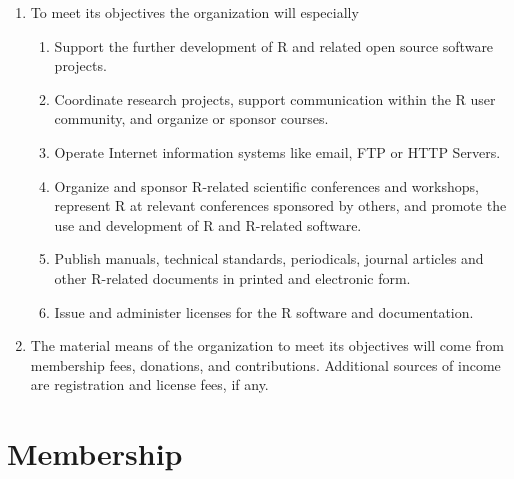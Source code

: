 \documentclass[a4paper]{article}
\begin{document}
\begin{enumerate}
 \item To meet its objectives the organization will especially
  \begin{enumerate}
   \item Support the further development of R and related open source
    software projects.
   \item Coordinate research projects, support communication within
    the R user community, and organize or sponsor courses.
   \item Operate Internet information systems like email, FTP or HTTP
    Servers.
   \item Organize and sponsor R-related scientific conferences and
    workshops, represent R at relevant conferences sponsored by
    others, and promote the use and development of R and R-related
    software.
   \item Publish manuals, technical standards, periodicals, journal
    articles and other R-related documents in printed and electronic
    form.
    \item Issue and administer licenses for the R software and
     documentation.
  \end{enumerate}
  
 \item The material means of the organization to meet its objectives
  will come from membership fees, donations, and contributions.
  Additional sources of income are registration and license fees, if
  any.
\end{enumerate}

\section{Membership}
\end{document}

